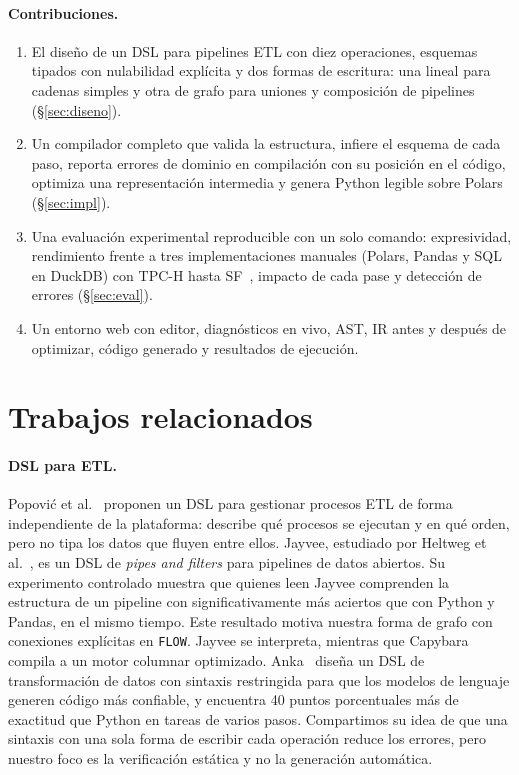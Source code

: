 \documentclass[sigplan,screen,nonacm]{acmart}
\begin{document}
\paragraph{Contribuciones.}
\begin{enumerate}
  \item El diseño de un DSL para pipelines ETL con diez operaciones, esquemas tipados con
    nulabilidad explícita y dos formas de escritura: una lineal para cadenas simples y otra
    de grafo para uniones y composición de pipelines (\S\ref{sec:diseno}).
  \item Un compilador completo que valida la estructura, infiere el esquema de cada paso,
    reporta errores de dominio en compilación con su posición en el código, optimiza una
    representación intermedia y genera Python legible sobre Polars (\S\ref{sec:impl}).
  \item Una evaluación experimental reproducible con un solo comando: expresividad,
    rendimiento frente a tres implementaciones manuales (Polars, Pandas y SQL en DuckDB)
    con TPC-H hasta SF~\SFmax{}, impacto de cada pase y detección de errores
    (\S\ref{sec:eval}).
  \item Un entorno web con editor, diagnósticos en vivo, AST, IR antes y después de
    optimizar, código generado y resultados de ejecución.
\end{enumerate}

\section{Trabajos relacionados}

\paragraph{DSL para ETL.}
Popović et al.~\cite{popovic2024} proponen un DSL para gestionar procesos ETL de forma
independiente de la plataforma: describe qué procesos se ejecutan y en qué orden, pero no
tipa los datos que fluyen entre ellos. Jayvee, estudiado por Heltweg et al.~\cite{heltweg2025},
es un DSL de \emph{pipes and filters} para pipelines de datos abiertos. Su experimento
controlado muestra que quienes leen Jayvee comprenden la estructura de un pipeline con
significativamente más aciertos que con Python y Pandas, en el mismo tiempo. Este resultado
motiva nuestra forma de grafo con conexiones explícitas en \texttt{FLOW}. Jayvee se
interpreta, mientras que Capybara compila a un motor columnar optimizado. Anka~\cite{mazrouei2025}
diseña un DSL de transformación de datos con sintaxis restringida para que los modelos de
lenguaje generen código más confiable, y encuentra 40 puntos porcentuales más de exactitud
que Python en tareas de varios pasos. Compartimos su idea de que una sintaxis con una sola
forma de escribir cada operación reduce los errores, pero nuestro foco es la verificación
estática y no la generación automática.
\end{document}
